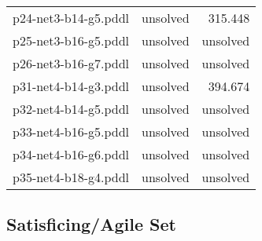 \documentclass{article}
\begin{document}
\begin{center}
\begin{tabular}{r|r|r}
 p24-net3-b14-g5.pddl&unsolved&315.448\\
 p25-net3-b16-g5.pddl&unsolved&unsolved\\
 p26-net3-b16-g7.pddl&unsolved&unsolved\\
 p31-net4-b14-g3.pddl&unsolved&394.674\\
 p32-net4-b14-g5.pddl&unsolved&unsolved\\
 p33-net4-b16-g5.pddl&unsolved&unsolved\\
 p34-net4-b16-g6.pddl&unsolved&unsolved\\
 p35-net4-b18-g4.pddl&unsolved&unsolved
                            \end{tabular}
                            \end{center}
                    

                    \subsection*{Satisficing/Agile Set}
                    
\end{document}
